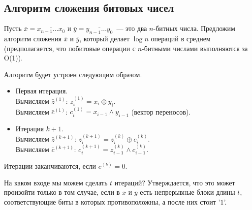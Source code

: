 \documentclass[12pt]{article}
\theoremstyle{definition}
\theoremstyle{plain}
\theoremstyle{remark}
\begin{document}
\subsection{Алгоритм сложения битовых чисел}
Пусть $\bar x=\overline{x_{n-1}\dotso x_0}$ и $\bar y = \overline{y_{n-1}\dotso y_0}$~---
это два $n$-битных числа.  Предложим алгоритм сложения $\bar x$ и $\bar y$, который делает
$\log n$ операций в среднем (предполагается, что побитовые операции с
$n$-битными числами выполняются за O(1)).

Алгоритм будет устроен следующим образом.
\begin{itemize}
    \item Первая итерация.\\
        Вычисляем $\bar z^{(1)}$: $z_i^{(1)} = x_i \oplus y_i$.\\
        Вычисляем $\bar c^{(1)}$: $c_i^{(1)} = x_{i-1} \land  y_{i-1}$ (вектор переносов).
    \item Итерация $k+1$.\\
        Вычисляем $\bar z^{(k+1)}$: $z_i^{(k+1)} = z_i^{(k)} \oplus c_i^{(k)}$.\\
        Вычисляем $\bar c^{(k+1)}$: $c_i^{(k+1)} = z_{i-1}^{(k)} \land  c_{i-1}^{(k)}$.
\end{itemize}
Итерации заканчиваются, если $\bar c^{(k)} = 0$.

На каком входе мы можем сделать $t$ итераций? Утверждается, что это может произойти
только в том случае, если в $\bar x$ и $\bar y$
есть непрерывные блоки длины $t$, соответствующие биты в которых противоположны,
а после них стоит '$1$'.
\begin{center}
\end{center}
\end{document}
